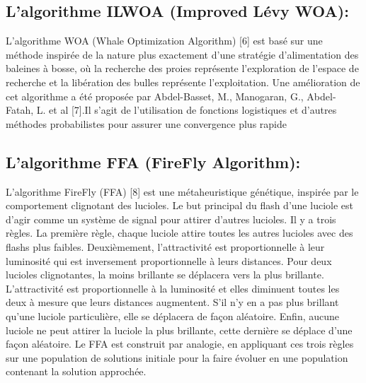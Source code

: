 \documentclass[class=report, crop=false]{standalone}
\begin{document}
        \subsection{L’algorithme ILWOA (Improved Lévy WOA): }
        L’algorithme WOA (Whale Optimization Algorithm) [6] est basé sur une méthode inspirée de la nature plus exactement d’une stratégie d’alimentation des baleines à bosse, où la recherche des proies représente l’exploration de l’espace de recherche et la libération des bulles représente l’exploitation.
Une amélioration de cet algorithme a été proposée par Abdel-Basset, M., Manogaran, G., Abdel-Fatah, L. et al [7].Il s’agit de l’utilisation de fonctions logistiques et d’autres méthodes probabilistes pour assurer une convergence plus rapide
        \subsection{L’algorithme FFA (FireFly Algorithm): }
        L'algorithme FireFly (FFA) [8] est une métaheuristique génétique, inspirée par le comportement clignotant des lucioles. Le but principal du flash d'une luciole est d'agir comme un système de signal pour attirer d'autres lucioles. Il y a trois règles. La première règle, chaque luciole attire toutes les autres lucioles avec des flashs plus faibles. Deuxièmement, l'attractivité est proportionnelle à leur luminosité qui est inversement proportionnelle à leurs distances. Pour deux lucioles clignotantes, la moins brillante se déplacera vers la plus brillante. L'attractivité est proportionnelle à la luminosité et elles diminuent toutes les deux à mesure que leurs distances augmentent. S'il n'y en a pas plus brillant qu'une luciole particulière, elle se déplacera de façon aléatoire. Enfin, aucune luciole ne peut attirer la luciole la plus brillante, cette dernière se déplace d’une façon aléatoire. Le FFA est construit par analogie, en appliquant ces trois règles sur une population de solutions initiale pour la faire évoluer en une population contenant la solution approchée.
\end{document}

